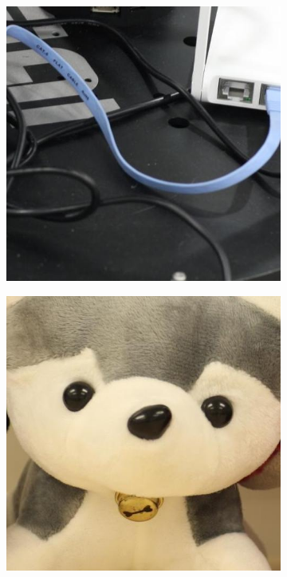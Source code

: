 \begin{figure}
\begin{subfigure}[t]{0.19\textwidth}
    \end{subfigure}
    \hfill
    \begin{subfigure}[t]{0.19\textwidth}
        \centering
        \includegraphics[width=1\textwidth]{images/dataset/Canon5D2_5_160_6400_reciever_1_mean.JPG}
    \end{subfigure}
    \hfill
    \begin{subfigure}[t]{0.19\textwidth}
        \centering
        \includegraphics[width=1\textwidth]{images/dataset/Canon5D2_5_200_3200_toy_3_mean.JPG}

\end{subfigure}
\end{figure}
